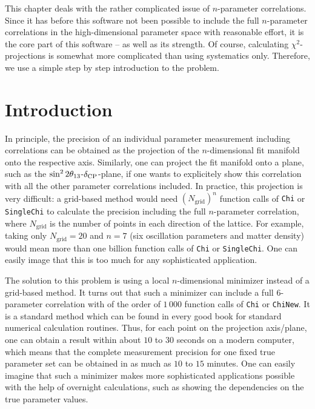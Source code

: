 This chapter deals with the rather complicated issue of $n$-parameter correlations. Since it has before this software  not been possible to include the full $n$-parameter correlations in the high-dimensional parameter space with reasonable effort, it is the core part of this software  -- as well as its strength. Of course, calculating $\chi^2$-projections is somewhat more complicated than using systematics only. Therefore, we use a simple step by step introduction to the problem. 

\section{Introduction}

In principle, the precision of an individual parameter measurement including correlations can be obtained as the projection of the $n$-dimensional fit manifold onto the respective axis. Similarly, one can project the fit manifold onto a plane, such as the $\sin^2 2 \theta_{13}$-$\delta_{\mathrm{CP}}$-plane, if one wants to explicitely show this correlation with all the other parameter correlations included. In practice, this projection is very difficult: a grid-based method would need $(N_{\mathrm{grid}})^n$ function calls of {\tt Chi} or {\tt SingleChi} to calculate the precision including the full $n$-parameter correlation, where $N_{\mathrm{grid}}$ is the number of points in each direction of the lattice. For example, taking only $N_{\mathrm{grid}}=20$ and $n=7$ (six oscillation parameters and matter density) would mean more than one billion function calls of {\tt Chi} or {\tt SingleChi}. One can easily image that this is too much for any sophisticated application.

The solution to this problem is using a local $n$-dimensional minimizer instead of a grid-based method. It turns out that such a minimizer can include a full $6$-parameter correlation with of the order of $1\, 000$ function calls of {\tt Chi} or {\tt ChiNew}. It is a standard method which can be found in every good book for standard numerical calculation routines. Thus, for each point on the projection axis/plane, one can obtain a result within about $10$ to $30$ seconds on a modern computer, which means that the complete measurement precision for one fixed true parameter set can be obtained in as much as $10$ to $15$ minutes. One can easily imagine that such a minimizer makes more sophisticated applications possible with the help of overnight calculations, such as showing the dependencies on the true parameter values.

